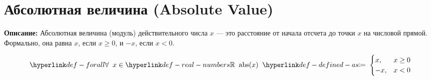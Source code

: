 
\section{Абсолютная величина (Absolute Value)}
\label{entity:op-abs-abstract}

\textbf{Описание:}
Абсолютная величина (модуль) действительного числа $x$ — это расстояние от начала отсчета до точки $x$ на числовой прямой. Формально, она равна $x$, если $x \geq 0$, и $-x$, если $x < 0$.

\hypertarget{def-abs-abstract}{}
\begin{definition}
\[
\TerForall x \in \RealNumbers
\mathrm{abs}(x) \TermDefinedAs
\begin{cases}
x, & x \geq 0 \\
-x, & x < 0
\end{cases}
\]
\end{definition}
